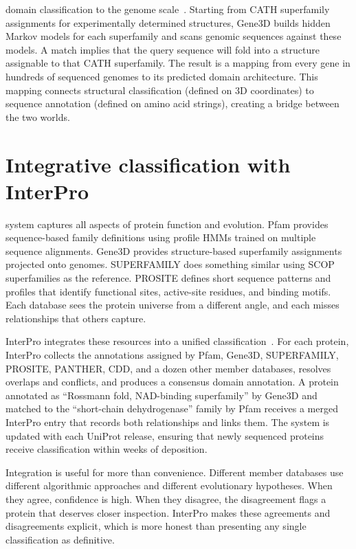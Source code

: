  domain classification to the genome scale~\cite{lees2012gene3d}. Starting
from CATH superfamily assignments for experimentally determined structures,
Gene3D builds hidden Markov models for each superfamily and scans genomic
sequences against these models. A match implies that the query sequence will fold
into a structure assignable to that CATH superfamily. The result is a mapping from
every gene in hundreds of sequenced genomes to its predicted domain architecture.
This mapping connects structural classification (defined on 3D coordinates) to
sequence annotation (defined on amino acid strings), creating a bridge between the
two worlds.


\section{Integrative classification with InterPro}
\label{sec:interpro}

 system captures all aspects of protein
function and evolution. Pfam provides sequence-based family definitions using
profile HMMs trained on multiple sequence alignments. Gene3D provides
structure-based superfamily assignments projected onto genomes. SUPERFAMILY does
something similar using SCOP superfamilies as the reference. PROSITE defines
short sequence patterns and profiles that identify functional sites, active-site
residues, and binding motifs. Each database sees the protein universe from a
different angle, and each misses relationships that others capture.

InterPro integrates these resources into a unified classification~\cite{blum2021}. For each
protein, InterPro collects the annotations assigned by Pfam, Gene3D,
SUPERFAMILY, PROSITE, PANTHER, CDD, and a dozen other member databases, resolves
overlaps and conflicts, and produces a consensus domain annotation. A protein
annotated as ``Rossmann fold, NAD-binding superfamily'' by Gene3D and matched to
the ``short-chain dehydrogenase'' family by Pfam receives a merged InterPro entry
that records both relationships and links them. The system is updated with each
UniProt release, ensuring that newly sequenced proteins receive classification
within weeks of deposition.

Integration is useful for more than convenience. Different member databases use
different algorithmic approaches and different evolutionary hypotheses. When they
agree, confidence is high. When they disagree, the disagreement flags a protein
that deserves closer inspection. InterPro makes these agreements and disagreements
explicit, which is more honest than presenting any single classification as
definitive.


